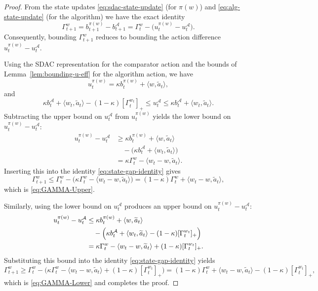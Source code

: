 \documentclass[11pt]{article}
\begin{document}
\begin{proof}
From the state updates \eqref{eq:sdac-state-update} (for $\pi(w)$) and \eqref{eq:alg-state-update} (for the algorithm) we have the exact identity
\begin{equation}
    \label{eq:state-gap-identity}
    \Gamma_{t+1}^w = b_{t+1}^{\pi(w)}-b_{t+1}^{\mathcal A} = \Gamma_t^w - \bigl(u_t^{\pi(w)}-u_t^{\mathcal A}\bigr).
\end{equation}
Consequently, bounding $\Gamma_{t+1}^w$ reduces to bounding the action difference $u_t^{\pi(w)}-u_t^{\mathcal A}$.

Using the SDAC representation for the comparator action and the bounds of Lemma~\ref{lem:bounding-u-eff} for the algorithm action, we have
\[
u_t^{\pi(w)} = \kappa b_t^{\pi(w)} + \langle w,\widetilde a_t\rangle,
\]
and
\[
\kappa b_t^{\mathcal A}+\langle w_t,\widetilde a_t\rangle-(1-\kappa)[\Gamma_t^{w_t}]_+ \le u_t^{\mathcal A} \le \kappa b_t^{\mathcal A}+\langle w_t,\widetilde a_t\rangle.
\]
Subtracting the upper bound on $u_t^{\mathcal A}$ from $u_t^{\pi(w)}$ yields the lower bound on $u_t^{\pi(w)}-u_t^{\mathcal A}$:
\begin{align*}
u_t^{\pi(w)}-u_t^{\mathcal A}
&\ge \kappa b_t^{\pi(w)}+\langle w,\widetilde a_t\rangle \\
&\quad - \bigl(\kappa b_t^{\mathcal A}+\langle w_t,\widetilde a_t\rangle\bigr) \\
&= \kappa\Gamma_t^w - \langle w_t-w,\widetilde a_t\rangle.
\end{align*}
Inserting this into the identity \eqref{eq:state-gap-identity} gives
\[
\Gamma_{t+1}^w \le \Gamma_t^w - \bigl(\kappa\Gamma_t^w - \langle w_t-w,\widetilde a_t\rangle\bigr) = (1-\kappa)\Gamma_t^w + \langle w_t-w,\widetilde a_t\rangle,
\]
which is \eqref{eq:GAMMA-Upper}.

Similarly, using the lower bound on $u_t^{\mathcal A}$ produces an upper bound on $u_t^{\pi(w)}-u_t^{\mathcal A}$:
\begin{align*}
u_t^{\pi(w)}-u_t^{\mathcal A}
&\le \kappa b_t^{\pi(w)}+\langle w,\widetilde a_t\rangle \\
&\quad - \Bigl(\kappa b_t^{\mathcal A}+\langle w_t,\widetilde a_t\rangle-(1-\kappa)[\Gamma_t^{w_t}]_+\Bigr) \\
&= \kappa\Gamma_t^w - \langle w_t-w,\widetilde a_t\rangle + (1-\kappa)[\Gamma_t^{w_t}]_+.
\end{align*}
Substituting this bound into the identity \eqref{eq:state-gap-identity} yields
\[
\Gamma_{t+1}^w \ge \Gamma_t^w - \bigl(\kappa\Gamma_t^w - \langle w_t-w,\widetilde a_t\rangle + (1-\kappa)[\Gamma_t^{w_t}]_+\bigr)
= (1-\kappa)\Gamma_t^w + \langle w_t-w,\widetilde a_t\rangle - (1-\kappa)[\Gamma_t^{w_t}]_+,
\]
which is \eqref{eq:GAMMA-Lower} and completes the proof.
\end{proof}
\end{document}
